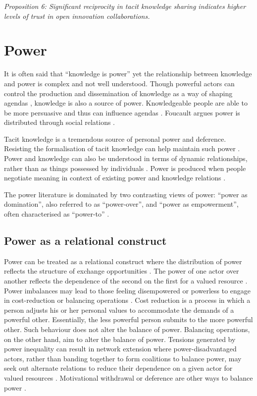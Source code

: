 \emph{Proposition 6: Significant reciprocity in tacit knowledge sharing indicates higher levels of trust in open innovation collaborations.}


\section{Power}
 
It is often said that \enquote{knowledge is power} yet the relationship between knowledge and power is complex and not well understood. Though powerful actors can control the production and dissemination of knowledge as a way of shaping agendas \citep{gaventa2007power}, knowledge is also a source of power. Knowledgeable people are able to be more persuasive and thus can influence agendas \citep{hart1997power}. Foucault argues power is distributed through social relations \citep{barker2016cultural}. 

Tacit knowledge is a tremendous source of personal power and deference. Resisting the formalisation of tacit knowledge can help maintain such power \citep{schultze2004knowing}. Power and knowledge can also be understood in terms of dynamic relationships, rather than as things possessed by individuals \citep{rouse2005power}. Power is produced when people negotiate meaning in context of existing power and knowledge relations \citep{heizmann2015power}. \medskip

The power literature is dominated by two contrasting views of power: \enquote{power as domination}, also referred to as \enquote{power-over}, and \enquote{power as empowerment}, often characterised as \enquote{power-to} \citep{haugaard2012rethinking}. \medskip

\subsection{Power as a relational construct}

Power can be treated as a relational construct where the distribution of power reflects the structure of exchange opportunities \citep{blau1964exchange,reagans2008knowledge,bonacich2009structural}. The power of one actor over another reflects the dependence of the second on the first for a valued resource \citep{emerson1962power}. Power imbalances may lead to those feeling disempowered or powerless to engage in cost-reduction or balancing operations \citep{emerson1962power}. Cost reduction is a process in which a person adjusts his or her personal values to accommodate the demands of a powerful other. Essentially, the less powerful person submits to the more powerful other. Such behaviour does not alter the balance of power. Balancing operations, on the other hand, aim to alter the balance of power. Tensions generated by power inequality can result in network extension where power-disadvantaged actors, rather than banding together to form coalitions to balance power, may seek out alternate relations to reduce their dependence on a given actor for valued resources \citep{cook2013social}. Motivational withdrawal or deference are other ways to balance power \citep{emerson1962power}. \medskip

